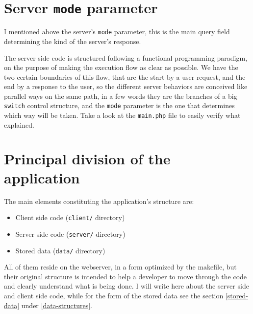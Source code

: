\documentclass[10pt,a4paper,english]{book}
\begin{document}
\section{Server \texttt{mode} parameter}
\label{server-mode-parameter}

I mentioned above the server's \texttt{mode} parameter, this is the main
query field determining the kind of the server's response.

The server side code is structured following a functional programming
paradigm, on the purpose of making the execution flow as clear as
possible. We have the two certain boundaries of this flow, that are
the start by a user request, and the end by a response to the user, so
the different server behaviors are conceived like parallel ways on the
same path, in a few words they are the branches of a big \texttt{switch}
control structure, and the \texttt{mode} parameter is the one that
determines which way will be taken. Take a look at the \texttt{main.php}
file to easily verify what explained.



\hypertarget{principal-division-of-the-application}{}
\section{Principal division of the application}
\label{principal-division-of-the-application}

The main elements constituting the application's structure are:
\begin{itemize}
\item {} 
Client side code (\texttt{client/} directory)

\item {} 
Server side code (\texttt{server/} directory)

\item {} 
Stored data (\texttt{data/} directory)

\end{itemize}

All of them reside on the webserver, in a form optimized by the
makefile, but their original structure is intended to help a developer
to move through the code and clearly understand what is being done.  I
will write here about the server side and client side code, while for
the form of the stored data see the section \href{\#stored-data}{\ref*{stored-data}} under \href{\#data-structures}{\ref*{data-structures}}.
\end{document}

